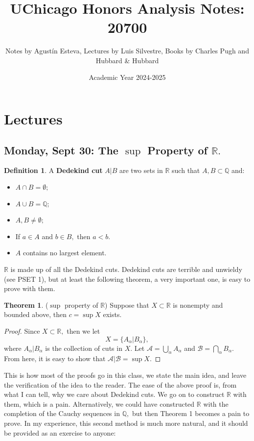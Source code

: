 \documentclass[10pt, oneside]{article}
\title{UChicago Honors Analysis Notes: 20700}
\author{Notes by Agustín Esteva, Lectures by Luis Silvestre, Books by Charles Pugh and Hubbard \& Hubbard}
\date{Academic Year 2024-2025}
\newcommand{\bbR}{\mathbb{R}}
\newcommand{\bbQ}{\mathbb{Q}}
\theoremstyle{definition}
\newtheorem{thm}{Theorem}
\newtheorem{defn}{Definition}
\begin{document}
\maketitle
\tableofcontents

\vspace{.25in}

\section{Lectures}

\subsection{Monday, Sept 30: The $\sup$ Property of $\bbR.$}
\begin{defn}
    A \textbf{Dedekind cut} $A | B$ are two sets in $\bbR$ such that $A, B \subset \bbQ$ and:
    \begin{itemize}
        \item $A \cap B  = \emptyset;$
        \item $A \cup B = \bbQ;$
        \item $A, B \neq \emptyset;$
        \item If $a \in A$ and $b\in B,$ then $a < b.$
        \item $A$ contains no largest element.
    \end{itemize}
\end{defn}
$\bbR$ is made up of all the Dedekind cuts. Dedekind cuts are terrible and unwieldy (see PSET 1), but at least the following theorem, a very important one, is easy to prove with them.  
\begin{thm} ($\sup$ property of $\bbR$) Suppose that $X \subset \bbR$ is nonempty and bounded above, then $c = \sup X$ exists.
\end{thm}
\begin{proof}
    Since $X \subset \bbR,$ then we let 
    \[X = \{A_\alpha | B_\alpha\},\] where $A_\alpha | B_\alpha$ is the collection of cuts in $X.$ Let $\mathcal{A} = \bigcup_{\alpha}A_\alpha$ and $\mathcal{B} = \bigcap_{\alpha}B_\alpha.$ From here, it is easy to show that $\mathcal{A} | \mathcal{B} = \sup X.$   
\end{proof}
This is how most of the proofs go in this class, we state the main idea, and leave the verification of the idea to the reader. The ease of the above proof is, from what I can tell, why we care about Dedekind cuts. We go on to construct $\bbR$ with them, which is a pain. Alternatively, we could have constructed $\bbR$ with the completion of the Cauchy sequences in $\bbQ,$ but then Theorem 1 becomes a pain to prove. In my experience, this second method is much more natural, and it should be provided as an exercise to anyone: 
\end{document}
